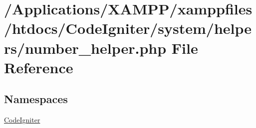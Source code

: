 \hypertarget{number__helper_8php}{}\section{/\+Applications/\+X\+A\+M\+P\+P/xamppfiles/htdocs/\+Code\+Igniter/system/helpers/number\+\_\+helper.php File Reference}
\label{number__helper_8php}
\subsection*{Namespaces}
\begin{DoxyCompactItemize}
\item 
 \mbox{\hyperlink{namespace_code_igniter}{Code\+Igniter}}
\end{DoxyCompactItemize}
